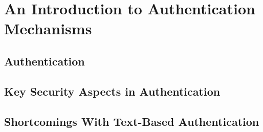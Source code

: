 \chapter{An Introduction to Authentication Mechanisms} \label{chap:background}

	\section{Authentication} \label{sec:authentication}

	\section{Key Security Aspects in Authentication} \label{sec:entropy}

	\section{Shortcomings With Text-Based Authentication} \label{sec:shortcomings}
